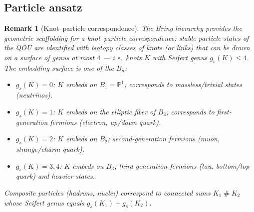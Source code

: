 \documentclass[12pt,a4paper]{report}
\newtheorem{remark}[theorem]{Remark}
\providecommand{\DIFaddtex}[1]{{\protect\color{DIFgreen} \sf #1}} %
\providecommand{\DIFadd}[1]{\texorpdfstring{\DIFaddtex{#1}}{#1}} %
\begin{document}
\subsection{\DIFadd{Particle ansatz}}
\DIFadd{\label{subsec:particle-ansatz}
}

\begin{remark}[Knot--particle correspondence]
\DIFadd{\label{rem:knot-particle-correspondence}
The Bring hierarchy provides the geometric scaffolding for a knot--particle
correspondence: stable particle states of the QOU are identified with
isotopy classes of knots (or links) that can be drawn on a surface of
genus at most $4$ --- i.e.\ knots $K$ with Seifert genus
$g_s(K) \le 4$.  The embedding surface is one of the $B_n$:
}\begin{itemize}
  \item \DIFadd{$g_s(K)=0$: $K$ embeds on $B_1 = \mathbb{P}^1$; corresponds to
        massless/trivial states (neutrinos).
  }\item \DIFadd{$g_s(K)=1$: $K$ embeds on the elliptic fiber of $B_3$;
        corresponds to first-generation fermions (electron, up/down
        quark).
  }\item \DIFadd{$g_s(K)=2$: $K$ embeds on $B_2$; second-generation
        fermions (muon, strange/charm quark).
  }\item \DIFadd{$g_s(K)=3,4$: $K$ embeds on $B_3$; third-generation
        fermions (tau, bottom/top quark) and heavier states.
}\end{itemize}
\DIFadd{Composite particles (hadrons, nuclei) correspond to connected sums
$K_1 \mathbin{\#} K_2$ whose Seifert genus equals $g_s(K_1)+g_s(K_2)$.
}\end{remark}
\end{document}
